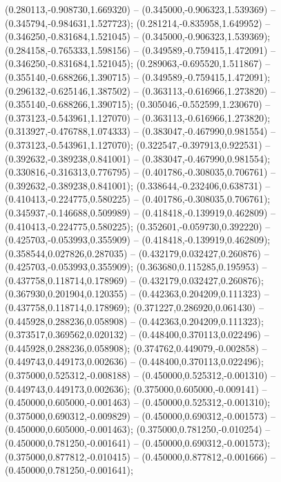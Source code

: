  (0.280113,-0.908730,1.669320) -- (0.345000,-0.906323,1.539369) -- (0.345794,-0.984631,1.527723);
 (0.281214,-0.835958,1.649952) -- (0.346250,-0.831684,1.521045) -- (0.345000,-0.906323,1.539369);
 (0.284158,-0.765333,1.598156) -- (0.349589,-0.759415,1.472091) -- (0.346250,-0.831684,1.521045);
 (0.289063,-0.695520,1.511867) -- (0.355140,-0.688266,1.390715) -- (0.349589,-0.759415,1.472091);
 (0.296132,-0.625146,1.387502) -- (0.363113,-0.616966,1.273820) -- (0.355140,-0.688266,1.390715);
 (0.305046,-0.552599,1.230670) -- (0.373123,-0.543961,1.127070) -- (0.363113,-0.616966,1.273820);
 (0.313927,-0.476788,1.074333) -- (0.383047,-0.467990,0.981554) -- (0.373123,-0.543961,1.127070);
 (0.322547,-0.397913,0.922531) -- (0.392632,-0.389238,0.841001) -- (0.383047,-0.467990,0.981554);
 (0.330816,-0.316313,0.776795) -- (0.401786,-0.308035,0.706761) -- (0.392632,-0.389238,0.841001);
 (0.338644,-0.232406,0.638731) -- (0.410413,-0.224775,0.580225) -- (0.401786,-0.308035,0.706761);
 (0.345937,-0.146688,0.509989) -- (0.418418,-0.139919,0.462809) -- (0.410413,-0.224775,0.580225);
 (0.352601,-0.059730,0.392220) -- (0.425703,-0.053993,0.355909) -- (0.418418,-0.139919,0.462809);
 (0.358544,0.027826,0.287035) -- (0.432179,0.032427,0.260876) -- (0.425703,-0.053993,0.355909);
 (0.363680,0.115285,0.195953) -- (0.437758,0.118714,0.178969) -- (0.432179,0.032427,0.260876);
 (0.367930,0.201904,0.120355) -- (0.442363,0.204209,0.111323) -- (0.437758,0.118714,0.178969);
 (0.371227,0.286920,0.061430) -- (0.445928,0.288236,0.058908) -- (0.442363,0.204209,0.111323);
 (0.373517,0.369562,0.020132) -- (0.448400,0.370113,0.022496) -- (0.445928,0.288236,0.058908);
 (0.374762,0.449079,-0.002858) -- (0.449743,0.449173,0.002636) -- (0.448400,0.370113,0.022496);
 (0.375000,0.525312,-0.008188) -- (0.450000,0.525312,-0.001310) -- (0.449743,0.449173,0.002636);
 (0.375000,0.605000,-0.009141) -- (0.450000,0.605000,-0.001463) -- (0.450000,0.525312,-0.001310);
 (0.375000,0.690312,-0.009829) -- (0.450000,0.690312,-0.001573) -- (0.450000,0.605000,-0.001463);
 (0.375000,0.781250,-0.010254) -- (0.450000,0.781250,-0.001641) -- (0.450000,0.690312,-0.001573);
 (0.375000,0.877812,-0.010415) -- (0.450000,0.877812,-0.001666) -- (0.450000,0.781250,-0.001641);
